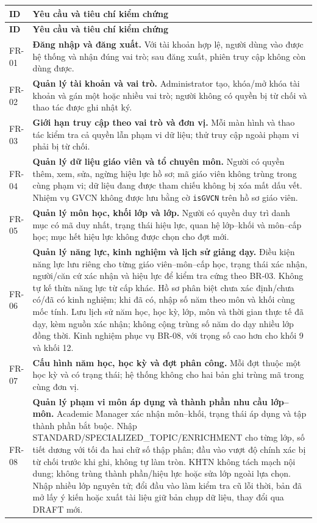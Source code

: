 \documentclass[12pt,a4paper]{report}
\begin{document}
\begin{longtable}{|p{1.45cm}|p{12.5cm}|}
\hline
\textbf{ID} & \textbf{Yêu cầu và tiêu chí kiểm chứng} \\\hline
\endfirsthead
\hline
\textbf{ID} & \textbf{Yêu cầu và tiêu chí kiểm chứng} \\\hline
\endhead
FR-01 & \textbf{Đăng nhập và đăng xuất.} Với tài khoản hợp lệ, người dùng vào được hệ thống và nhận đúng vai trò; sau đăng xuất, phiên truy cập không còn dùng được. \\\hline
FR-02 & \textbf{Quản lý tài khoản và vai trò.} Administrator tạo, khóa/mở khóa tài khoản và gán một hoặc nhiều vai trò; người không có quyền bị từ chối và thao tác được ghi nhật ký. \\\hline
FR-03 & \textbf{Giới hạn truy cập theo vai trò và đơn vị.} Mỗi màn hình và thao tác kiểm tra cả quyền lẫn phạm vi dữ liệu; thử truy cập ngoài phạm vi phải bị từ chối. \\\hline
FR-04 & \textbf{Quản lý dữ liệu giáo viên và tổ chuyên môn.} Người có quyền thêm, xem, sửa, ngừng hiệu lực hồ sơ; mã giáo viên không trùng trong cùng phạm vi; dữ liệu đang được tham chiếu không bị xóa mất dấu vết. Nhiệm vụ GVCN không được lưu bằng cờ \texttt{isGVCN} trên hồ sơ giáo viên. \\\hline
FR-05 & \textbf{Quản lý môn học, khối lớp và lớp.} Người có quyền duy trì danh mục có mã duy nhất, trạng thái hiệu lực, quan hệ lớp--khối và môn--cấp học; mục hết hiệu lực không được chọn cho đợt mới. \\\hline
FR-06 & \textbf{Quản lý năng lực, kinh nghiệm và lịch sử giảng dạy.} Điều kiện năng lực lưu riêng cho từng giáo viên--môn--cấp học, trạng thái xác nhận, người/căn cứ xác nhận và hiệu lực để kiểm tra cứng theo BR-03. Không tự kế thừa năng lực từ cấp khác. Hồ sơ phân biệt chưa xác định/chưa có/đã có kinh nghiệm; khi đã có, nhập số năm theo môn và khối cùng mốc tính. Lưu lịch sử năm học, học kỳ, lớp, môn và thời gian thực tế đã dạy, kèm nguồn xác nhận; không cộng trùng số năm do dạy nhiều lớp đồng thời. Kinh nghiệm phục vụ BR-08, với trọng số cao hơn cho khối 9 và khối 12. \\\hline
FR-07 & \textbf{Cấu hình năm học, học kỳ và đợt phân công.} Mỗi đợt thuộc một học kỳ và có trạng thái; hệ thống không cho hai bản ghi trùng mã trong cùng đơn vị. \\\hline
FR-08 & \textbf{Quản lý phạm vi môn áp dụng và thành phần nhu cầu lớp--môn.} Academic Manager xác nhận môn--khối, trạng thái áp dụng và tập thành phần bắt buộc. Nhập STANDARD/SPECIALIZED\_TOPIC/ENRICHMENT cho từng lớp, số tiết dương với tối đa hai chữ số thập phân; đầu vào vượt độ chính xác bị từ chối trước khi ghi, không tự làm tròn. KHTN không tách mạch nội dung; không trùng thành phần/hiệu lực hoặc sửa lớp ngoài lựa chọn. Nhập nhiều lớp nguyên tử; đổi đầu vào làm kiểm tra cũ lỗi thời, bản đã mở lấy ý kiến hoặc xuất tài liệu giữ bản chụp dữ liệu, thay đổi qua DRAFT mới. \\\hline

\end{longtable}
\end{document}
